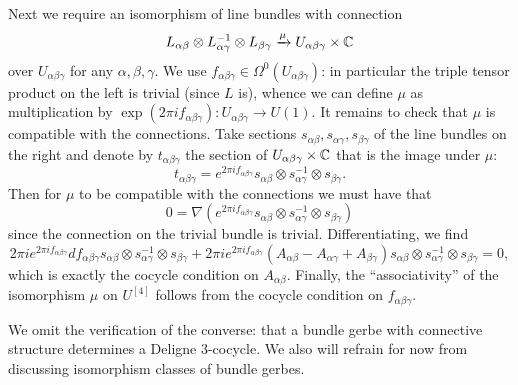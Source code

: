\documentclass{amsart}
\begin{document}
Next we require an isomorphism of line bundles with connection
\begin{equation*}
    L_{\alpha\beta}\otimes L_{\alpha\gamma}^{-1}\otimes L_{\beta\gamma} \xrightarrow{\mu} U_{\alpha\beta\gamma}\times \mathbb{C}
\end{equation*}
over $U_{\alpha\beta\gamma}$ for any $\alpha,\beta,\gamma$. We use
$f_{\alpha\beta\gamma}\in\Omega^0(U_{\alpha\beta\gamma})$: in particular
the triple tensor product on the left is trivial (since $L$ is), whence we can
define $\mu$ as multiplication by $\exp(2\pi if_{\alpha\beta\gamma}):U_{\alpha\beta\gamma}\to U(1)$. 
It remains to check that $\mu$ is compatible with the connections. Take sections
$s_{\alpha\beta}, s_{\alpha\gamma}, s_{\beta\gamma}$ of the line bundles on the right
and denote by $t_{\alpha\beta\gamma}$ the section of $U_{\alpha\beta\gamma}\times\mathbb{C}$
that is the image under $\mu$:
\begin{equation*}
    t_{\alpha\beta\gamma} = e^{2\pi i f_{\alpha\beta\gamma}} s_{\alpha\beta} \otimes s_{\alpha\gamma}^{-1} \otimes s_{\beta\gamma}.
\end{equation*}
Then for $\mu$ to be compatible with the connections we must have that
\begin{equation*}
    0=\nabla (e^{2\pi i f_{\alpha\beta\gamma}} s_{\alpha\beta} \otimes s_{\alpha\gamma}^{-1} \otimes s_{\beta\gamma})
\end{equation*}
since the connection on the trivial bundle is trivial. Differentiating, we find
\begin{equation*}
    2\pi i e^{2\pi i f_{\alpha\beta\gamma}} df_{\alpha\beta\gamma} s_{\alpha\beta} \otimes s_{\alpha\gamma}^{-1} \otimes s_{\beta\gamma}
    + 2\pi ie^{2\pi if_{\alpha\beta\gamma}}(A_{\alpha\beta}-A_{\alpha\gamma}+A_{\beta\gamma}) s_{\alpha\beta} \otimes s_{\alpha\gamma}^{-1} \otimes s_{\beta\gamma}
    =0,
\end{equation*}
which is exactly the cocycle condition on $A_{\alpha\beta}$.
Finally, the ``associativity'' of the isomorphism $\mu$ on $U^{[4]}$ follows from the
cocycle condition on $f_{\alpha\beta\gamma}$.

We omit the verification of the converse: that a bundle gerbe with connective
structure determines a Deligne 3-cocycle. We also will refrain for now from discussing
isomorphism classes of bundle gerbes.
\end{document}
